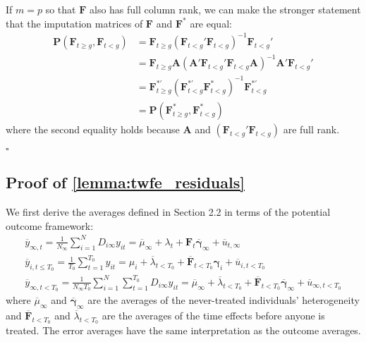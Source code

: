 If $m = p$ so that $\bm{F}$ also has full column rank, we can make the stronger statement that the imputation matrices of $\bm{F}$ and $\bm{F}^{*}$ are equal: 
    \begin{align*}
        \bm P (\bm{F}_{t \geq g}, \bm{F}_{t < g}) 
        &= \bm{F}_{t \geq g} (\bm{F}_{t < g}' \bm{F}_{t < g})^{-1} \bm{F}_{t < g}' \\
        &= \bm{F}_{t \geq g} \bm A (\bm A'\bm{F}_{t < g}' \bm{F}_{t < g} \bm A)^{-1} \bm A' \bm{F}_{t < g}' \\
        &= \bm{F}^{*'}_{t \geq g} (\bm{F}^{*'}_{t < g} \bm{F}^{*}_{t < g})^{-1} \bm{F}^{*'}_{t < g} \\
        &= \bm P(\bm{F}^{*}_{t \geq g}, \bm{F}^{*}_{t < g})
    \end{align*}
    where the second equality holds because $\bm A$ and $(\bm{F}_{t < g}' \bm{F}_{t < g})$ are full rank.

$\square$

\subsection{Proof of \autoref{lemma:twfe_residuals}}

We first derive the averages defined in Section 2.2 in terms of the potential outcome framework:
\begin{gather*}
    \overline{y}_{\infty , t} = \frac{1}{N_{\infty}} \sum_{i = 1}^N D_{i \infty} y_{it} = \overline{\mu}_{\infty} + \lambda_t + \bm{F}_t \overline{\bm \gamma}_{\infty} + \overline{u}_{t, \infty}\\
    \overline{y}_{i,t\leq T_0} = \frac{1}{T_0} \sum_{t = 1}^{T_0} y_{it} = \mu_i + \overline{\lambda}_{t < T_0} + \overline{\bm{F}}_{t < T_0} \bm \gamma_i + \overline{u}_{i,t < T_0}\\
    \overline{y}_{\infty, t < T_0} = \frac{1}{N_{\infty} T_0} \sum_{i = 1}^N \sum_{t = 1}^{T_0} D_{i \infty} y_{it} = \overline{\mu}_{\infty} + \overline{\lambda}_{t < T_0} + \overline{\bm{F}}_{t < T_0} \overline{\bm \gamma}_{\infty} + \overline{u}_{\infty, t < T_0}
\end{gather*}
where $\overline{\mu}_{\infty}$ and $\overline{\bm \gamma}_{\infty}$ are the averages of the never-treated individuals' heterogeneity and $\overline{\bm{F}}_{t < T_0}$ and $\overline{\lambda}_{t < T_0}$ are the averages of the time effects before anyone is treated. The error averages have the same interpretation as the outcome averages.

